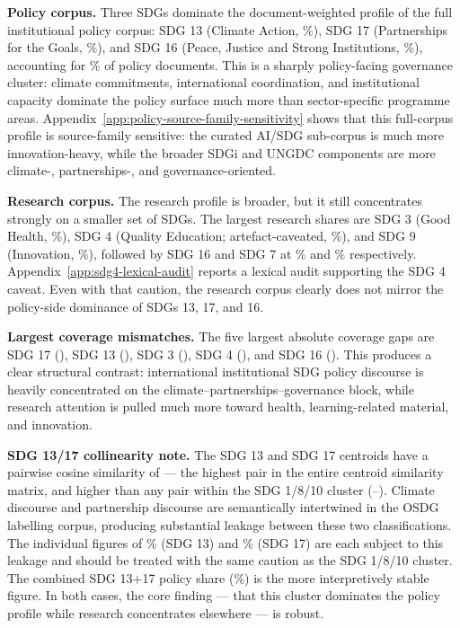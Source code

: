 \documentclass[12pt,a4paper]{article}
\begin{document}
\textbf{Policy corpus.} Three SDGs dominate the document-weighted profile of the full institutional policy corpus: SDG 13 (Climate Action, \PolicyPctSdgThirteen\%), SDG 17 (Partnerships for the Goals, \PolicyPctSdgSeventeen\%), and SDG 16 (Peace, Justice and Strong Institutions, \PolicyPctSdgSixteen\%), accounting for \PolicyTopThreePct\% of policy documents. This is a sharply policy-facing governance cluster: climate commitments, international coordination, and institutional capacity dominate the policy surface much more than sector-specific programme areas. Appendix~\ref{app:policy-source-family-sensitivity} shows that this full-corpus profile is source-family sensitive: the curated AI/SDG sub-corpus is much more innovation-heavy, while the broader SDGi and UNGDC components are more climate-, partnerships-, and governance-oriented.

\textbf{Research corpus.} The research profile is broader, but it still concentrates strongly on a smaller set of SDGs. The largest research shares are SDG 3 (Good Health, \ResearchPctSdgThree\%), SDG 4 (Quality Education; artefact-caveated, \ResearchPctSdgFour\%), and SDG 9 (Innovation, \ResearchPctSdgNine\%), followed by SDG 16 and SDG 7 at \ResearchPctSdgSixteen\% and \ResearchPctSdgSeven\% respectively. Appendix~\ref{app:sdg4-lexical-audit} reports a lexical audit supporting the SDG 4 caveat. Even with that caution, the research corpus clearly does not mirror the policy-side dominance of SDGs 13, 17, and 16.

\textbf{Largest coverage mismatches.} The five largest absolute coverage gaps are SDG 17 (\CoverageGapSdgSeventeen), SDG 13 (\CoverageGapSdgThirteen), SDG 3 (\CoverageGapSdgThree), SDG 4 (\CoverageGapSdgFour), and SDG 16 (\CoverageGapSdgSixteen). This produces a clear structural contrast: international institutional SDG policy discourse is heavily concentrated on the climate--partnerships--governance block, while research attention is pulled much more toward health, learning-related material, and innovation.

\textbf{SDG 13/17 collinearity note.} The SDG 13 and SDG 17 centroids have a pairwise cosine similarity of \CentroidSimThirteenSeventeen{} --- the highest pair in the entire centroid similarity matrix, and higher than any pair within the SDG 1/8/10 cluster (\CentroidSimOneEightTenMin--\CentroidSimOneEightTenMax). Climate discourse and partnership discourse are semantically intertwined in the OSDG labelling corpus, producing substantial leakage between these two classifications. The individual figures of \PolicyPctSdgThirteen\% (SDG 13) and \PolicyPctSdgSeventeen\% (SDG 17) are each subject to this leakage and should be treated with the same caution as the SDG 1/8/10 cluster. The combined SDG 13+17 policy share (\PolicyPctSdgThreePlusSeventeen\%) is the more interpretively stable figure. In both cases, the core finding --- that this cluster dominates the policy profile while research concentrates elsewhere --- is robust.
\end{document}
